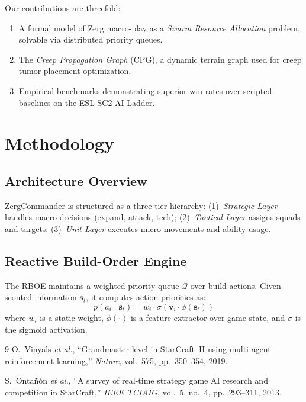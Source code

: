 \documentclass[conference]{IEEEtran}
\begin{document}
Our contributions are threefold:
\begin{enumerate}
  \item A formal model of Zerg macro-play as a \textit{Swarm Resource Allocation}
        problem, solvable via distributed priority queues.
  \item The \textit{Creep Propagation Graph} (CPG), a dynamic terrain graph used
        for creep tumor placement optimization.
  \item Empirical benchmarks demonstrating superior win rates over scripted baselines
        on the ESL SC2 AI Ladder.
\end{enumerate}

\section{Methodology}
\subsection{Architecture Overview}
ZergCommander is structured as a three-tier hierarchy:
(1)~\textit{Strategic Layer} handles macro decisions (expand, attack, tech);
(2)~\textit{Tactical Layer} assigns squads and targets;
(3)~\textit{Unit Layer} executes micro-movements and ability usage.

\subsection{Reactive Build-Order Engine}
The RBOE maintains a weighted priority queue $\mathcal{Q}$ over build actions.
Given scouted information $\mathbf{s}_t$, it computes action priorities as:
\begin{equation}
  p(a_i \mid \mathbf{s}_t) = w_i \cdot \sigma(\mathbf{v}_i \cdot \phi(\mathbf{s}_t))
\end{equation}
where $w_i$ is a static weight, $\phi(\cdot)$ is a feature extractor over game
state, and $\sigma$ is the sigmoid activation.

\begin{thebibliography}{9}
O.~Vinyals \textit{et al.}, ``Grandmaster level in StarCraft~II using multi-agent
reinforcement learning,'' \textit{Nature}, vol.~575, pp.~350--354, 2019.

S.~Ontañón \textit{et al.}, ``A survey of real-time strategy game AI research and
competition in StarCraft,'' \textit{IEEE TCIAIG}, vol.~5, no.~4, pp.~293--311, 2013.
\end{thebibliography}
\end{document}
